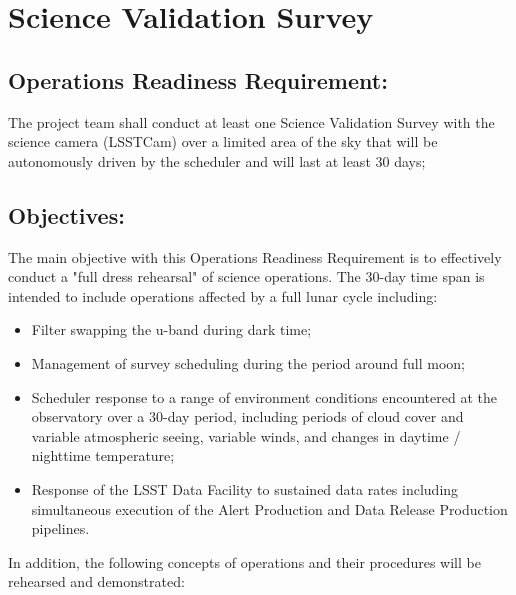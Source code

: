 \section{Science Validation Survey}  \label{sec:svs}

\subsection{Operations Readiness Requirement:}

The project team shall conduct at least one Science Validation Survey with the science camera (LSSTCam) over a limited area of the sky that will be autonomously driven by the scheduler and will last at least 30 days;

\subsection{Objectives:}

The main objective with this Operations Readiness Requirement is to effectively conduct a "full dress rehearsal" of science operations.  The 30-day time span is intended to include operations affected by a full lunar cycle including:

\begin{itemize}
\item Filter swapping the u-band during dark time;
\item Management of survey scheduling during the period around full moon;
\item Scheduler response to a range of environment conditions encountered at the observatory over a 30-day period, including periods of cloud cover and variable atmospheric seeing, variable winds, and changes in daytime / nighttime temperature;
\item Response of the LSST Data Facility to sustained data rates including simultaneous execution of the Alert Production and Data Release Production pipelines.
\end{itemize}

In addition, the following concepts of operations and their procedures will be rehearsed and demonstrated:

